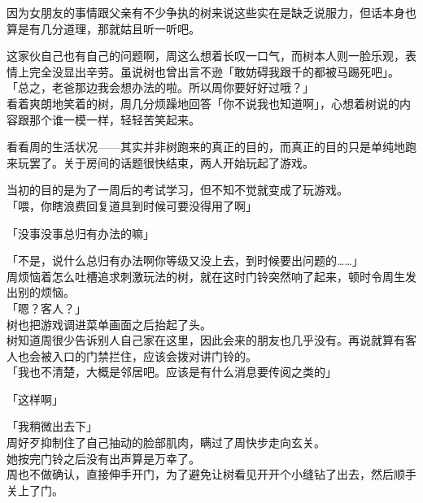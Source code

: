 因为女朋友的事情跟父亲有不少争执的树来说这些实在是缺乏说服力，但话本身也算是有几分道理，那就姑且听一听吧。

这家伙自己也有自己的问题啊，周这么想着长叹一口气，而树本人则一脸乐观，表情上完全没显出辛劳。虽说树也曾出言不逊「敢妨碍我跟千的都被马踢死吧」。\\

「总之，老爸那边我会想办法的啦。所以周你要好好过哦？」\\

看着爽朗地笑着的树，周几分烦躁地回答「你不说我也知道啊」，心想着树说的内容跟那个谁一模一样，轻轻苦笑起来。\\

\vspace{2\baselineskip}

看看周的生活状况——其实并非树跑来的真正的目的，而真正的目的只是单纯地跑来玩罢了。关于房间的话题很快结束，两人开始玩起了游戏。

当初的目的是为了一周后的考试学习，但不知不觉就变成了玩游戏。\\

「喂，你瞎浪费回复道具到时候可要没得用了啊」

「没事没事总归有办法的嘛」

「不是，说什么总归有办法啊你等级又没上去，到时候要出问题的……」\\

周烦恼着怎么吐槽追求刺激玩法的树，就在这时门铃突然响了起来，顿时令周生发出别的烦恼。\\

「嗯？客人？」\\

树也把游戏调进菜单画面之后抬起了头。\\

树知道周很少告诉别人自己家在这里，因此会来的朋友也几乎没有。再说就算有客人也会被入口的门禁拦住，应该会拨对讲门铃的。\\

「我也不清楚，大概是邻居吧。应该是有什么消息要传阅之类的」

「这样啊」

「我稍微出去下」\\

周好歹抑制住了自己抽动的脸部肌肉，瞒过了周快步走向玄关。\\

她按完门铃之后没有出声算是万幸了。\\

周也不做确认，直接伸手开门，为了避免让树看见开开个小缝钻了出去，然后顺手关上了门。\\

